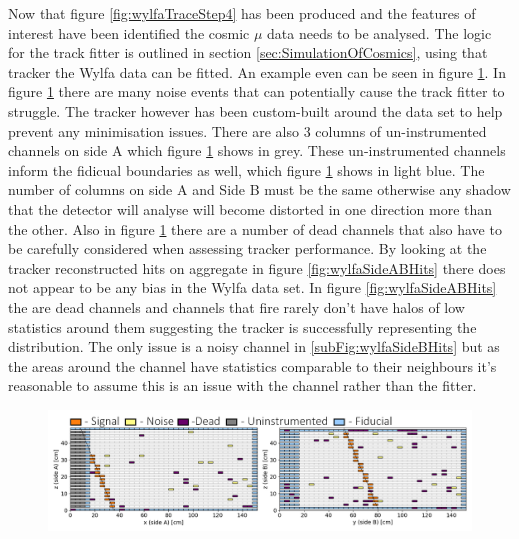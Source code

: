 Now that figure \ref{fig:wylfaTraceStep4} has been produced and the features of interest have been identified the cosmic $\mu$ data needs to be analysed. The logic for the track fitter is outlined in section \ref{sec:SimulationOfCosmics}, using that tracker the Wylfa data can be fitted. An example even can be seen in figure \ref{fig:3000ExampleEventWithKey}. In figure \ref{fig:3000ExampleEventWithKey} there are many noise events that can potentially cause the track fitter to struggle. The tracker however has been custom-built around the data set to help prevent any minimisation issues. There are also 3 columns of un-instrumented channels on side A which figure \ref{fig:3000ExampleEventWithKey} shows in grey. These un-instrumented channels inform the fidicual boundaries as well, which figure \ref{fig:3000ExampleEventWithKey} shows in light blue. The number of columns on side A and Side B must be the same otherwise any shadow that the detector will analyse will become distorted in one direction more than the other. Also in figure \ref{fig:3000ExampleEventWithKey} there are a number of dead channels that also have to be carefully considered when assessing tracker performance. By looking at the tracker reconstructed hits on aggregate in figure \ref{fig:wylfaSideABHits} there does not appear to be any bias in the Wylfa data set. In figure \ref{fig:wylfaSideABHits} the are dead channels and channels that fire rarely don't have halos of low statistics around them suggesting the tracker is successfully representing the distribution. The only issue is a noisy channel in \ref{subFig:wylfaSideBHits} but as the areas around the channel have statistics comparable to their neighbours it's reasonable to assume this is an issue with the channel rather than the fitter. 

\begin{figure}[!h]
 \centering
 \includegraphics[width=\linewidth]{Chapter6/Figs/newExampleEventWylfa.png}
 \label{fig:3000ExampleEventWithKey}
\end{figure}


